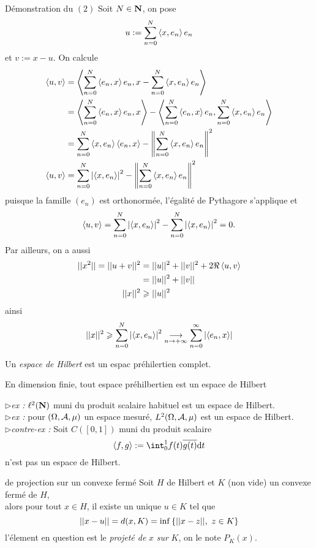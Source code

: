 \documentclass[a4paper,11pt, twoside]{article}
\begin{document}
\begin{ProofC}{Démonstration du $(\mathit 2)$}
  Soit $N\in\mathbf N$, on pose 
  $$u:=\sum_{n=0}^N\left\langle x,e_n \right\rangle e_n$$
  et $v:=x-u.$ On calcule
  \begin{align*}
    \left\langle u,v \right\rangle&=\left\langle \sum_{n=0}^N\left\langle e_n,x \right\rangle e_n,x-\sum_{n=0}^N\left\langle x,e_n \right\rangle e_n \right\rangle\\
    &=\left\langle \sum_{n=0}^N\left\langle e_n,x \right\rangle e_n,x \right\rangle-\left\langle \sum_{n=0}^N\left\langle e_n,x \right\rangle e_n,\sum_{n=0}^N\left\langle x,e_n \right\rangle e_n \right\rangle\\
    &=\sum_{n=0}^N\left\langle x,e_n \right\rangle\left\langle e_n,x \right\rangle-\left\lVert\sum_{n=0}^N\left\langle x,e_n \right\rangle e_n\right\rVert^2\\
    \left\langle u,v \right\rangle&=\sum_{n=0}^N\left| \left\langle x,e_n \right\rangle\right|^2-\left\lVert\sum_{n=0}^N\left\langle x,e_n \right\rangle e_n\right\rVert^2
  \end{align*}
  puisque la famille $(e_n)$ est orthonormée, l'égalité de Pythagore s'applique et 
  $$\left\langle u,v \right\rangle=\sum_{n=0}^N\left| \left\langle x,e_n \right\rangle\right|^2-\sum_{n=0}^N\left| \left\langle x,e_n \right\rangle\right|^2=0.$$
  Par ailleurs, on a aussi
  \begin{align*}
    ||x^2||=||u+v||^2&=||u||^2+||v||^2+2\Re\left\langle u,v \right\rangle\\
    &=||u||^2+||v||\\
    ||x||^2&\geqslant ||u||^2
  \end{align*}
  ainsi 
  $$||x||^2\geqslant \sum_{n=0}^N\left| \left\langle x,e_n \right\rangle\right|^2\underset{n\to+\infty}{\longrightarrow} \sum_{n=0}^\infty\left| \left\langle e_n,x \right\rangle\right|$$
\end{ProofC}




\begin{Def}
  Un \emph{espace de Hilbert} est un espac préhilertien complet.
\end{Def}


\begin{RQ}
  En dimension finie, tout espace préhilbertien est un espace de Hilbert
\end{RQ}


$\triangleright$\emph{ex : }$\ell^2(\mathbf N)$ muni du produit scalaire habituel est un espace de Hilbert.\\


$\triangleright$\emph{ex : }pour $(\Omega,\mathcal A,\mu)$ un espace mesuré, $L^2(\Omega,\mathcal A,\mu)$ est un espace de Hilbert.\\


$\triangleright$\emph{contre-ex : }Soit $C([0,1])$ muni du produit scalaire 
$$\ps{f,g}:=\int_0^1f(t)\overline{g(t)}\dt$$
n'est pas un espace de Hilbert.


\begin{thC}{de projection sur un convexe fermé}
  Soit $H$ de Hilbert et $K$ (non vide) un convexe fermé de $H$,\\

  alors pour tout $x\in H$, il existe un unique $u\in K$ tel que 
  $$||x-u||=d(x,K)=\mathrm{inf}\left\{||x-z||,\ z\in K\right\}$$
  l'élement en question est le \emph{projeté de }$x$\emph{ sur }$K$, on le note $P_K(x).$
\end{thC}
\end{document}
